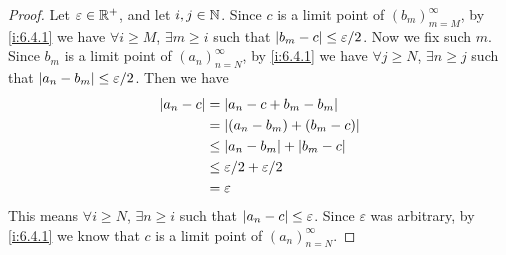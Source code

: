 \begin{proof}
  Let \(\varepsilon \in \mathbb{R}^+\), and let \(i, j \in \mathbb{N}\).
  Since \(c\) is a limit point of \((b_m)_{m = M}^\infty\), by \cref{i:6.4.1} we have \(\forall i \geq M\), \(\exists m \geq i\) such that \(\left\lvert b_m - c\right\rvert \leq \varepsilon / 2\).
  Now we fix such \(m\).
  Since \(b_m\) is a limit point of \((a_n)_{n = N}^\infty\), by \cref{i:6.4.1} we have \(\forall j \geq N\), \(\exists n \geq j\) such that \(\left\lvert a_n - b_m\right\rvert \leq \varepsilon / 2\).
  Then we have
  \begin{align*}
    \left\lvert a_n - c\right\rvert & = \left\lvert a_n - c + b_m - b_m\right\rvert            \\
                  & = \left\lvert(a_n - b_m) + (b_m - c)\right\rvert        \\
                  & \leq \left\lvert a_n - b_m\right\rvert + \left\lvert b_m - c\right\rvert   \\
                  & \leq \varepsilon / 2 + \varepsilon / 2 \\
                  & = \varepsilon
  \end{align*}
  This means \(\forall i \geq N\), \(\exists n \geq i\) such that \(\left\lvert a_n - c\right\rvert \leq \varepsilon\).
  Since \(\varepsilon\) was arbitrary, by \cref{i:6.4.1} we know that \(c\) is a limit point of \((a_n)_{n = N}^\infty\).
\end{proof}
